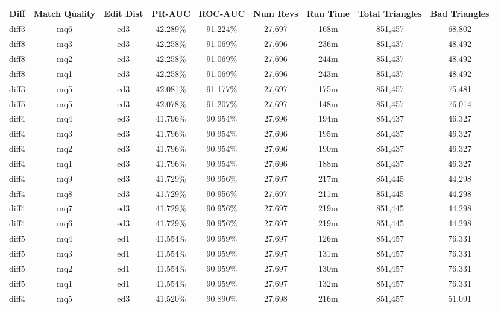 \begin{sidewaystable}[!ph]
  \begin{center}
    \begin{tabular}{|c|c|c||c|c||c|c|c|c|}
\hline
Diff & Match Quality & Edit Dist
        & PR-AUC & ROC-AUC
        & Num Revs & Run Time
        & Total Triangles & Bad Triangles \\
\hline
\hline
diff3 & mq6 & ed3 & 42.289\% & 91.224\% & 27,697 & 168m & 851,457 & 68,802 \\
diff8 & mq3 & ed3 & 42.258\% & 91.069\% & 27,696 & 236m & 851,437 & 48,492 \\
diff8 & mq2 & ed3 & 42.258\% & 91.069\% & 27,696 & 244m & 851,437 & 48,492 \\
diff8 & mq1 & ed3 & 42.258\% & 91.069\% & 27,696 & 243m & 851,437 & 48,492 \\
diff3 & mq5 & ed3 & 42.081\% & 91.177\% & 27,697 & 175m & 851,457 & 75,481 \\
diff5 & mq5 & ed3 & 42.078\% & 91.207\% & 27,697 & 148m & 851,457 & 76,014 \\
diff4 & mq4 & ed3 & 41.796\% & 90.954\% & 27,696 & 194m & 851,437 & 46,327 \\
diff4 & mq3 & ed3 & 41.796\% & 90.954\% & 27,696 & 195m & 851,437 & 46,327 \\
diff4 & mq2 & ed3 & 41.796\% & 90.954\% & 27,696 & 190m & 851,437 & 46,327 \\
diff4 & mq1 & ed3 & 41.796\% & 90.954\% & 27,696 & 188m & 851,437 & 46,327 \\
diff4 & mq9 & ed3 & 41.729\% & 90.956\% & 27,697 & 217m & 851,445 & 44,298 \\
diff4 & mq8 & ed3 & 41.729\% & 90.956\% & 27,697 & 211m & 851,445 & 44,298 \\
diff4 & mq7 & ed3 & 41.729\% & 90.956\% & 27,697 & 219m & 851,445 & 44,298 \\
diff4 & mq6 & ed3 & 41.729\% & 90.956\% & 27,697 & 219m & 851,445 & 44,298 \\
diff5 & mq4 & ed1 & 41.554\% & 90.959\% & 27,697 & 126m & 851,457 & 76,331 \\
diff5 & mq3 & ed1 & 41.554\% & 90.959\% & 27,697 & 131m & 851,457 & 76,331 \\
diff5 & mq2 & ed1 & 41.554\% & 90.959\% & 27,697 & 130m & 851,457 & 76,331 \\
diff5 & mq1 & ed1 & 41.554\% & 90.959\% & 27,697 & 132m & 851,457 & 76,331 \\
diff4 & mq5 & ed3 & 41.520\% & 90.890\% & 27,698 & 216m & 851,457 & 51,091 \\

\end{tabular}
\end{center}
\end{sidewaystable}

